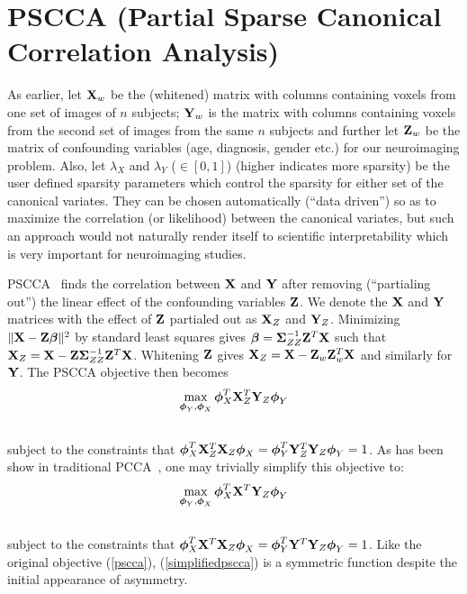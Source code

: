 \documentclass{llncs}
\newcommand{\X}{{\bf X}}
\newcommand{\Y}{{\bf Y}}
\newcommand{\Z}{{\bf Z}}
\newcommand{\bs}{\boldsymbol}
\newcommand{\bSigma}{\boldsymbol \Sigma}
\begin{document}
\section{PSCCA (Partial Sparse Canonical Correlation Analysis)}
As earlier, let $\X_w$ be the (whitened) matrix with columns containing voxels from one set of
images of $n$ subjects; $\Y_w$ is the matrix with columns containing voxels from the second
set of images from the same $n$ subjects and further let $\Z_w$ be the matrix of confounding variables (age, diagnosis, gender etc.) for our neuroimaging problem. Also, let $\lambda_X$ and $\lambda_Y$ ($\in [0,1]$) (higher indicates more sparsity) be the user defined sparsity parameters which control the sparsity for either set of the canonical variates. They can be chosen automatically (``data driven'') so as to maximize the correlation (or likelihood) between the canonical variates, but such an approach would not naturally render itself  to scientific interpretability which is very important for neuroimaging studies. 

PSCCA~\cite{timm} finds the correlation between $\X$ and $\Y$ after
removing (``partialing out'') the linear effect of the confounding
variables $\Z$.  We denote the $\X$ and $\Y$ matrices with the effect
of $\Z$ partialed out as $\X_Z$ and $\Y_Z$.  Minimizing $\| \X - \Z
\bs\beta \|^2 $ by standard least squares gives
 $\bs\beta = \bSigma_{ZZ}^{-1} \Z^T \X$ such that $\X_Z = \X - \Z  \bSigma_{ZZ}^{-1} \Z^T \X$.  Whitening $\Z$ gives $\X_Z=\X - \Z_w \Z_w^T \X$
 and similarly for $\Y$.
The PSCCA objective then becomes 
\begin{eqnarray}
\label{pscca}
\max_{{\bs\phi_Y}, {\bs\phi_X}} \bs\phi_X^T  \X_Z^T \Y_Z \bs\phi_Y \\ \notag
\end{eqnarray}
subject to the constraints that $\bs\phi_X^T \X_Z^T \X_Z \bs\phi_X 
=  \bs\phi_Y^T \Y_Z^T \Y_Z \bs\phi_Y = 1$. 
As has been show in traditional PCCA~\cite{timm}, one may trivially simplify this objective to:
\begin{eqnarray}
\label{simplifiedpscca}
\max_{{\bs\phi_Y}, {\bs\phi_X}} \bs\phi_X^T  \X^T \Y_Z \bs\phi_Y \\ \notag
\end{eqnarray}
subject to the constraints that $\bs\phi_X^T \X^T \X_Z \bs\phi_X 
=  \bs\phi_Y^T \Y^T \Y_Z \bs\phi_Y = 1$.   Like the original objective
(\ref{pscca}),
(\ref{simplifiedpscca}) is a symmetric function despite the initial appearance of asymmetry. 
\end{document}
